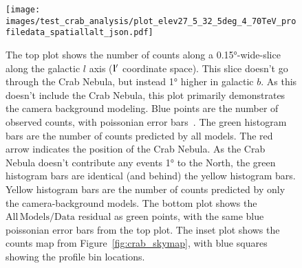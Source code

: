   \begin{figure}[!ht]
    \centering
    \texttt{[image: images/test\_crab\_analysis/plot\_elev27\_5\_32\_5deg\_4\_70TeV\_profiledata\_spatiallalt\_json.pdf]}
    \caption[Crab Nebula Profile along Galactic $l$ Off Source]
    {
      The top plot shows the number of counts along a \ang{0.15}-wide-slice along the galactic $l$ axis ($\mathbf{l'}$ coordinate space).
      This slice doesn't go through the Crab Nebula, but instead \ang{1} higher in galactic $b$.
      As this doesn't include the Crab Nebula, this plot primarily demonstrates the camera background modeling.
      Blue points are the number of observed counts, with poissonian error bars~\cite{poissonfrequentistinterval}.
      The green histogram bars are the number of counts predicted by all models.
      The red arrow indicates the position of the Crab Nebula.
      As the Crab Nebula doesn't contribute any events \ang{1} to the North, the green histogram bars are identical (and behind) the yellow histogram bars.
      Yellow histogram bars are the number of counts predicted by only the camera-background models.
      The bottom plot shows the $\mathrm{All\,Models}/\mathrm{Data}$ residual as green points, with the same blue poissonian error bars from the top plot.
      The inset plot shows the counts map from Figure~\ref{fig:crab_skymap}, with blue squares showing the profile bin locations.
    }
    \label{fig:crab_profile_l_off}
  \end{figure}

